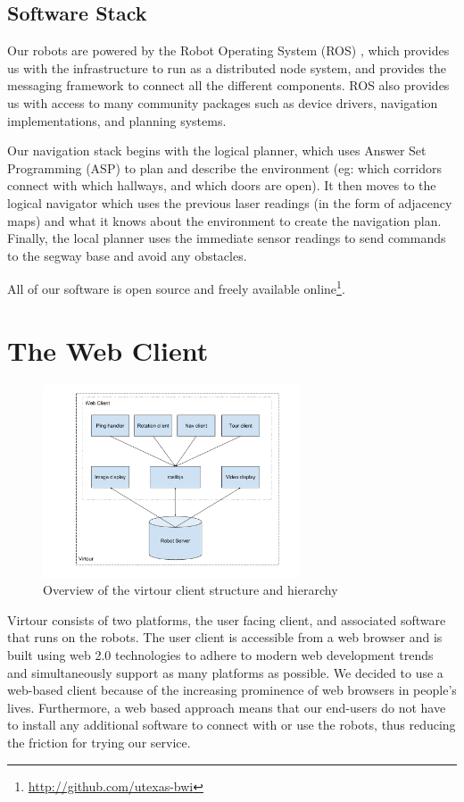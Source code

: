 \documentclass[
  oneside,
  11pt, a4paper,
  footinclude=true,
  headinclude=true,
  cleardoublepage=empty
]{article}
\begin{document}
\subsection{Software Stack}

Our robots are powered by the Robot Operating System (ROS) \cite{quigley2009},
which provides us with the infrastructure to run as a distributed node system,
and provides the messaging framework to connect all the different components.
ROS also provides us with access to many community packages such as device
drivers, navigation implementations, and planning systems.

Our navigation stack begins with the logical planner, which uses Answer Set
Programming (ASP) \cite{lifschitz2008} to plan and describe the environment
(eg: which corridors connect with which hallways, and which doors are open). It
then moves to the logical navigator which uses the previous laser readings (in
the form of adjacency maps) and what it knows about the environment to create
the navigation plan. Finally, the local planner uses the immediate sensor
readings to send commands to the segway base and avoid any obstacles.

All of our software is open source and freely available
online\footnote{\url{http://github.com/utexas-bwi}}.

\section{The Web Client}

\begin{figure}
\centering
\includegraphics[width=3in]{virtour_client}
\caption{Overview of the virtour client structure and hierarchy}
\end{figure}

Virtour consists of two platforms, the user facing client, and associated
software that runs on the robots. The user client is accessible from a web
browser and is built using web 2.0 technologies to adhere to modern web
development trends and simultaneously support as many platforms as possible. We
decided to use a web-based client because of the increasing prominence of web
browsers in people's lives. Furthermore, a web based approach means that our
end-users do not have to install any additional software to connect with or use
the robots, thus reducing the friction for trying our service.
\end{document}
